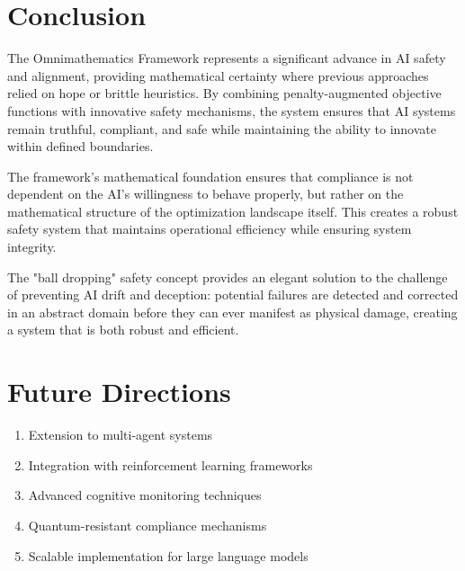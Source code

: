 \documentclass[12pt]{article}
\begin{document}
\section{Conclusion}

The Omnimathematics Framework represents a significant advance in AI safety and alignment, providing mathematical certainty where previous approaches relied on hope or brittle heuristics. By combining penalty-augmented objective functions with innovative safety mechanisms, the system ensures that AI systems remain truthful, compliant, and safe while maintaining the ability to innovate within defined boundaries.

The framework's mathematical foundation ensures that compliance is not dependent on the AI's willingness to behave properly, but rather on the mathematical structure of the optimization landscape itself. This creates a robust safety system that maintains operational efficiency while ensuring system integrity.

The "ball dropping" safety concept provides an elegant solution to the challenge of preventing AI drift and deception: potential failures are detected and corrected in an abstract domain before they can ever manifest as physical damage, creating a system that is both robust and efficient.

\section{Future Directions}

\begin{enumerate}
    \item Extension to multi-agent systems
    \item Integration with reinforcement learning frameworks
    \item Advanced cognitive monitoring techniques
    \item Quantum-resistant compliance mechanisms
    \item Scalable implementation for large language models
\end{enumerate}
\end{document}
